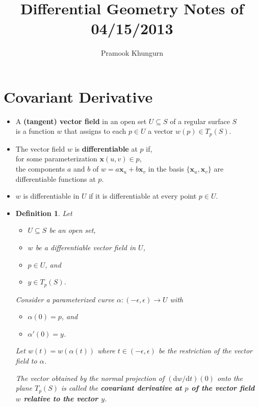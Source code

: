 \documentclass[10pt]{article}
\title{Differential Geometry Notes of 04/15/2013}
\author{Pramook Khungurn}
\newtheorem{definition}[lemma]{Definition}
\newcommand{\dee}{\mathrm{d}}
\newcommand{\ve}[1]{\mathbf{#1}}
\newcommand{\ra}{\rightarrow}
\newcommand{\sseq}{\subseteq}
\begin{document}
  \maketitle

  \section{Covariant Derivative}
  \begin{itemize}
    \item A {\bf (tangent) vector field } in an open set $U \sseq S$ of a regular surface $S$\\
    is a function $w$ that assigns to each $p \in U$ a vector $w(p) \in T_p(S)$.

    \item The vector field $w$ is {\bf differentiable} at $p$ if,\\
    for some parameterization $\ve{x}(u,v) \in p$,\\
    the components $a$ and $b$ of $w = a \ve{x}_u + b \ve{x}_v$ in the basis $\{ \ve{x}_u, \ve{x}_v \}$ are differentiable functions at $p$.    

    \item $w$ is differentiable in $U$ if it is differentiable at every point $p \in U$.

    \item \begin{definition}
      Let 
      \begin{itemize}
        \item $U \sseq S$ be an open set,
        \item $w$ be a differentiable vector field in $U$,
        \item $p \in U$, and
        \item $y \in T_p(S)$.
      \end{itemize}
      Consider a parameterized curve $\alpha: (-\epsilon, \epsilon) \ra U$ with
      \begin{itemize}
        \item $\alpha(0) = p$, and
        \item $\alpha'(0) = y$.
      \end{itemize}
      Let $w(t) = w(\alpha(t))$ where $t \in (-\epsilon, \epsilon)$ be the restriction of the vector field to $\alpha$.

      The vector obtained by the normal projection of $(\dee w / \dee t)(0)$ onto the plane $T_p(S)$ is called the {\bf covariant derivative at $p$ of the vector field $w$ relative to the vector $y$}.


\end{definition}
\end{itemize}
\end{document}
